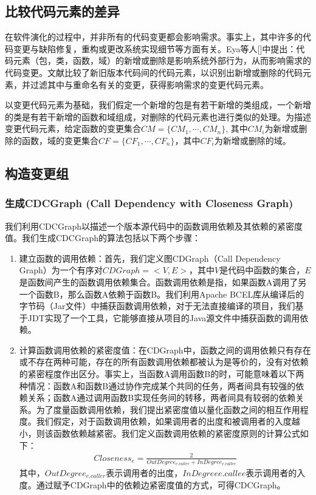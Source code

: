 \subsection{比较代码元素的差异}

在软件演化的过程中，并非所有的代码变更都会影响需求。事实上，其中许多的代码变更与缺陷修复，重构或更改系统实现细节等方面有关。Eya等人[]中提出：代码元素（包，类，函数，域）的新增或删除是影响系统外部行为，从而影响需求的代码变更。文献比较了新旧版本代码间的代码元素，以识别出新增或删除的代码元素，并过滤其中与重命名有关的变更，获得影响需求的变更代码元素。

以变更代码元素为基础，我们假定一个新增的包是有若干新增的类组成，一个新增的类是有若干新增的函数和域组成，对删除的代码元素也进行类似的处理。为描述变更代码元素，给定函数的变更集合$CM = \{CM_{1}, \cdots, CM_{n}\}$, 其中$CM_{i}$为新增或删除的函数，域的变更集合$CF = \{CF_{1}, \cdots, CF_{n}\}$，其中$CF_{i}$为新增或删除的域。

\subsection{构造变更组}
\subsubsection{生成CDCGraph (Call Dependency with Closeness Graph)}
我们利用CDCGraph以描述一个版本源代码中的函数调用依赖及其依赖的紧密度值。我们生成CDCGraph的算法包括以下两个步骤：
\begin{enumerate}
  \item 建立函数的调用依赖：首先，我们定义图CDGraph（Call Dependency Graph）为一个有序对$CDGraph = <V, E>$，其中$V$是代码中函数的集合，$E$是函数间产生的函数调用依赖集合。函数调用依赖是指，如果函数A调用了另一个函数B，那么函数A依赖于函数B。我们利用Apache BCEL库从编译后的字节码（Jar文件）中捕获函数调用依赖，对于无法直接编译的项目，我们基于JDT实现了一个工具，它能够直接从项目的Java源文件中捕获函数的调用依赖。

  \item 计算函数调用依赖的紧密度值：在CDGraph中，函数之间的调用依赖只有存在或不存在两种可能，存在的所有函数调用依赖都被认为是等价的，没有对依赖的紧密程度作出区分。事实上，当函数A调用函数B的时，可能意味着以下两种情况：函数A和函数B通过协作完成某个共同的任务，两者间具有较强的依赖关系；函数A通过调用函数B实现任务间的转移，两者间具有较弱的依赖关系。为了度量函数调用依赖，我们提出紧密度值以量化函数之间的相互作用程度。我们假定，对于函数调用依赖，如果调用者的出度和被调用者的入度越小，则该函数依赖越紧密。我们定义函数调用依赖的紧密度原则的计算公式如下：
  \begin{align}Closeness_{e}=\frac {2} {OutDegree_{e.caller}+InDegree_{e.callee}}\end{align}
  其中，$OutDegree_{e.caller}$表示调用者的出度，$InDegreee.callee$表示调用者的入度。通过赋予CDGraph中的依赖边紧密度值的方式，可得CDCGraph。
\end{enumerate}

